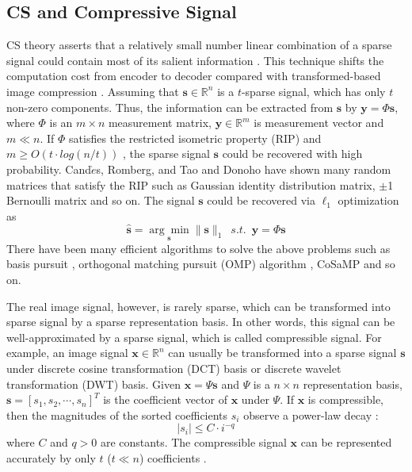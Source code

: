 \documentclass[conference]{IEEEtran}
\begin{document}
\subsection{CS and Compressive Signal}
CS theory asserts that a relatively small number linear combination of a sparse signal could contain most of its salient information \cite{donoho2006compressed}. This technique shifts the computation cost from encoder to decoder compared with transformed-based image compression \cite{baraniuk2007compressive}.
Assuming that $\mathbf{s}\in\mathbb{R}^n$ is a $t$-sparse signal, which has only  $t$ non-zero components. Thus, the information can be extracted from $\mathbf{s}$ by
$
\mathbf{y}=\Phi\mathbf{s}
$,
where $\Phi$ is an $m\times n$ measurement matrix, $\mathbf{y}\in\mathbb{R}^m$ is measurement vector and $m\ll n$.  If $\Phi$ satisfies the restricted isometric property (RIP) and {\small $m\geq O(t\cdot log(n/t))$ } \cite{candes2005decoding}, the sparse signal $\mathbf{s}$ could be recovered with high probability.
Cand$\grave{e}$s, Romberg, and Tao \cite{candes2006robust} and Donoho \cite{donoho2006compressed} have shown many random matrices that satisfy the RIP such as Gaussian identity distribution matrix, $\pm$1 Bernoulli matrix and so on. The signal $\mathbf{s}$ could be recovered via $\ell_1$ optimization as
\begin{equation*}
\hat{\mathbf{s}}=\underset{\mathbf{s}}{\arg\min}\parallel\mathbf{s}\parallel_{1}\,\,\, s.t.\,\,\,\mathbf{y}=\Phi\mathbf{s}
\end{equation*}
There have been many efficient algorithms to solve the above problems such as basis pursuit \cite{candes2005decoding}, orthogonal matching pursuit (OMP) algorithm \cite{OMP}, CoSaMP \cite{needell2009cosamp} and so on.

The real image signal, however, is rarely  sparse, which can be transformed into sparse signal by a sparse representation basis.  In other words, this signal can be well-approximated by a sparse signal, which is called compressible signal. For example, an image signal $\mathbf{x}\in \mathbb{R}^n$ can usually be transformed into a sparse signal $\mathbf{s}$ under  discrete cosine transformation (DCT) basis or discrete wavelet transformation (DWT) basis. Given $\mathbf{x}=\Psi\mathbf{s}$ and $\Psi$ is a $n\times n$ representation basis, $\mathbf{s}=[s_1,s_2,\cdots,s_n]^T$ is the coefficient vector of $\mathbf{x}$ under $\Psi$. If $\mathbf{x}$ is compressible, then the magnitudes of the sorted coefficients $s_i$ observe a power-law decay :
 \begin{equation*}
    |s_i|\leq C\cdot {i}^{-q}
 \end{equation*}
where $C$ and $q>0$ are constants. The compressible signal $\mathbf{x}$ can be represented accurately by only $t$ ($t\ll n$) coefficients \cite{compsig1998}.
\end{document}
